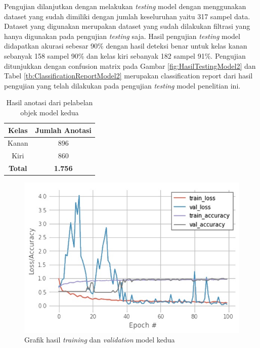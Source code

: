 Pengujian dilanjutkan dengan melakukan \emph{testing} model dengan menggunakan dataset yang sudah dimiliki dengan jumlah keseluruhan yaitu 317 sampel data. Dataset yang digunakan merupakan dataset yang sudah dilakukan filtrasi yang hanya digunakan pada pengujian \emph{testing} saja. Hasil pengujian \emph{testing} model didapatkan akurasi sebesar 90\% dengan hasil deteksi benar untuk kelas kanan sebanyak 158 sampel 90\% dan kelas kiri sebanyak 182 sampel 91\%. Pengujian ditunjukkan dengan confusion matrix pada Gambar \ref{fig:HasilTestingModel2} dan Tabel \ref{tb:ClassificationReportModel2} merupakan classification report dari hasil pengujian yang telah dilakukan pada pengujian \emph{testing} model penelitian ini.

\begin{longtable}{|c|c|}
  \caption{Hasil anotasi dari pelabelan objek model kedua}
  \label{tb:HasilAnotasi}  \\
  \hline
  \rowcolor[HTML]{C0C0C0}
  \textbf{Kelas} & \textbf{Jumlah Anotasi}  \\
  \hline
  Kanan           & 896    \\
  \hline
  Kiri            & 860    \\
  \hline
  \textbf{Total}  & \textbf{1.756}  \\
  \hline
\end{longtable}

\begin{figure}[H]
  \centering
  \includegraphics[scale=0.9]{gambar/belakang w.jpg}
  \caption{Grafik hasil \emph{training} dan \emph{validation} model kedua}
  \label{fig:HasilTrainingValidationModel2}
\end{figure}



